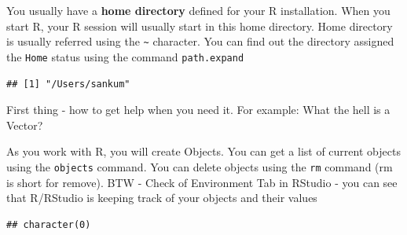 \documentclass[10pt, letterpaper, twoside]{memoir}\usepackage{knitr}
\begin{document}
You usually have a \textbf{home directory} defined for your R installation. When you start R, your R session will usually start in this home directory. Home directory is usually referred using the \verb|~| character. You can find out the directory assigned the \texttt{Home} status using the command \texttt{path.expand}
\begin{knitrout}
\color{fgcolor}\begin{kframe}
\begin{alltt}
\hlstd{(}\hlstd{)}
\end{alltt}
\begin{verbatim}
## [1] "/Users/sankum"
\end{verbatim}
\end{kframe}
\end{knitrout}

First thing - how to get help when you need it. For example: What the hell is a Vector?
\begin{knitrout}
\color{fgcolor}\begin{kframe}
\begin{alltt}
\hlstd{(}\hlstd{)}  
\hlstd{(}  
\hlstd{)}
\hlstd{(}\hlstd{)}  
\end{alltt}
\end{kframe}
\end{knitrout}

As you work with R, you will create Objects. You can get a list of current objects using the \texttt{objects} command. You can delete objects using the \texttt{rm} command (rm is short for remove). BTW - Check of Environment Tab in RStudio - you can see that R/RStudio is keeping track of your objects and their values

\begin{knitrout}
\color{fgcolor}\begin{kframe}
\begin{alltt}
\hlstd{()}
\end{alltt}
\begin{verbatim}
## character(0)
\end{verbatim}
\begin{alltt}
\hlstd{(} \hlstd{=} \hlstd{())}  
\end{alltt}
\end{kframe}
\end{knitrout}
\end{document}
